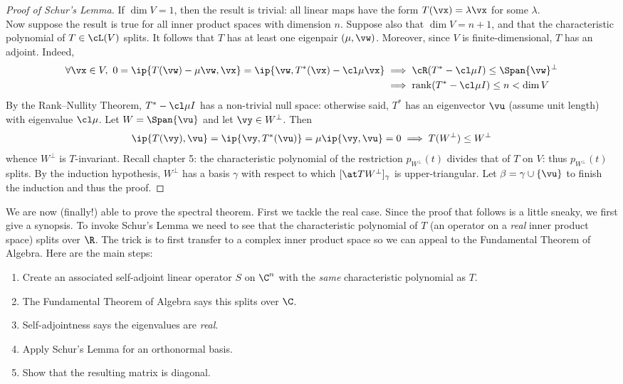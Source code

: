 \begin{proof}[Proof of Schur's Lemma]
If $\dim V=1$, then the result is trivial: all linear maps have the form $T(\vx)=\lambda\vx$ for some $\lambda$.\\[5pt]
Now suppose the result is true for all inner product spaces with dimension $n$. Suppose also that $\dim V=n+1$, and that the characteristic polynomial of $T\in \cL(V)$ splits. It follows that $T$ has at least one eigenpair $(\mu,\vw)$. Moreover, since $V$ is finite-dimensional, $T$ has an adjoint. Indeed,
\begin{align*}
\forall \vx\in V,\ 0=\ip{T(\vw)-\mu\vw,\vx}=\ip{\vw,T^*(\vx)-\cl\mu\vx} &\implies \cR(T^*-\cl\mu I)\le\Span\{\vw\}^\perp\\
&\implies \rank(T^*-\cl\mu I)\le n<\dim V
\end{align*}
By the Rank--Nullity Theorem, $T^*-\cl\mu I$ has a non-trivial null space: otherwise said, $T^*$ has an eigenvector $\vu$ (assume unit length) with eigenvalue $\cl\mu$. Let $W=\Span\{\vu\}$ and let $\vy\in W^\perp$. Then
\[\ip{T(\vy),\vu}=\ip{\vy,T^*(\vu)}=\mu\ip{\vy,\vu}=0\implies T(W^\perp)\le W^\perp\]
whence $W^\perp$ is $T$-invariant. Recall chapter 5: the characteristic polynomial of the restriction $p_{W^\perp}(t)$ divides that of $T$ on $V$: thus $p_{W^\perp}(t)$ splits. By the induction hypothesis, $W^\perp$ has a basis $\gamma$ with respect to which $[\at T{W^\perp}]_\gamma$ is upper-triangular. Let $\beta=\gamma\cup\{\vu\}$ to finish the induction and thus the proof.
\end{proof}

We are now (finally!) able to prove the spectral theorem. First we tackle the real case. Since the proof that follows is a little sneaky, we first give a synopsis. To invoke Schur's Lemma we need to see that the characteristic polynomial of $T$ (an operator on a \emph{real} inner product space) splits over $\R$. The trick is to first transfer to a complex inner product space so we can appeal to the Fundamental Theorem of Algebra. Here are the main steps:
\begin{enumerate}
  \item Create an associated self-adjoint linear operator $S$ on $\C^n$ with the \emph{same} characteristic polynomial as $T$.
  \item The Fundamental Theorem of Algebra says this splits over $\C$.
  \item Self-adjointness says the eigenvalues are \emph{real}.
  \item Apply Schur's Lemma for an orthonormal basis.
  \item Show that the resulting matrix is diagonal.
\end{enumerate}


